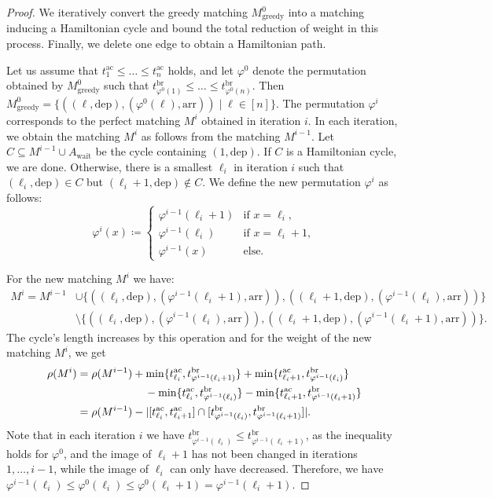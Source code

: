 \documentclass[11pt,a4paper]{article}
\newcommand{\arr}{\mathrm{arr}}
\newcommand{\dep}{\mathrm{dep}}
\newcommand{\wait}{\mathrm{wait}}
\newcommand{\energyact}{M}               %
\newcommand{\ac}{\mathrm{ac}}
\newcommand{\br}{\mathrm{br}}
\newcommand{\w}{\rho} %
\theoremstyle{definition}
\theoremstyle{remark}
\begin{document}
\begin{proof}
	We iteratively convert the greedy matching $\energyact^{0}_\text{greedy}$ into a matching inducing a Hamiltonian cycle and bound the total reduction of weight in this process. Finally, we delete one edge to obtain a Hamiltonian path.
	
	Let us assume that $t^{\ac}_1 \leq \dots \leq t^{\ac}_n$ holds, and let $\varphi^{0}$ denote the permutation obtained by $\energyact^{0}_\text{greedy}$ such that $t^{\br}_{\varphi^{0}(1)} \leq \dots \leq t^{\br}_{ \varphi^{0}(n)}$. Then $\energyact^{0}_\text{greedy} = \{( (\ell, \dep), (\varphi^{0}(\ell), \arr)) \mid \ell \in [n]\}$. 
	The permutation $\varphi^{i}$ corresponds to the perfect matching $\energyact^{i}$ obtained in iteration $i$.	
	In each iteration, we obtain the matching $\energyact^{i}$ as follows from the matching $\energyact^{i-1}$.
	Let $C \subseteq \energyact^{i-1} \cup A_\wait$ be the cycle containing $(1, \dep)$. If $C$ is a Hamiltonian cycle, we are done. Otherwise, there is a smallest $\ell_i$ in iteration $i$ such that $(\ell_i, \dep) \in C$ but $(\ell_i +1, \dep) \not \in C$. 
    We define the new permutation $\varphi^{i}$ as follows:
	\[\varphi^{i}(x) \coloneqq \begin{cases}
		\varphi^{i-1}(\ell_i +1) &\text{if  } x = \ell_i, \\
		\varphi^{i-1}(\ell_i) &\text{if  } x = \ell_i +1, \\
		\varphi^{i-1}(x) &\text{else.} 
	\end{cases}\]
	
	For the new matching $\energyact^{i}$ we have:
    \begin{align*}
    \energyact^{i} = \energyact^{i-1} &\cup \bigl\{((\ell_i, \dep), (\varphi^{i-1}(\ell_i+1), \arr)), ((\ell_i+1,\dep),(\varphi^{i-1}(\ell_i),\arr))\bigr\} \\
    &\setminus \bigl\{((\ell_i, \dep), (\varphi^{i-1}(\ell_i), \arr)), ((\ell_i+1, \dep), (\varphi^{i-1}(\ell_i+1), \arr))\bigr\}.
    \end{align*}
    The cycle's length increases by this operation and for the weight of the new matching $\energyact^{i}$, we get
	\begin{align*}
		\w(\energyact^{i}) &= \w(\energyact^{i-1}) + \min\{t^{\ac}_{\ell_i}, t^{\br}_{\varphi^{i-1}(\ell_i+1)}\} + \min\{t^{\ac}_{\ell_i+1}, t^{\br}_{\varphi^{i-1}(\ell_i)}\} \\ & \hspace{62 pt} - \min\{t^{\ac}_{\ell_i}, t^{\br}_{\varphi^{i-1}(\ell_i)}\} - \min\{t^{\ac}_{\ell_i+1}, t^{\br}_{\varphi^{i-1}(\ell_i+1)}\} \\
		&= \w(\energyact^{i-1}) - | [t^{\ac}_{\ell_i}, t^{\ac}_{\ell_i+1} ] \cap [t^{\br}_{\varphi^{i-1}(\ell_i)}, t^{\br}_{\varphi^{i-1}(\ell_i+1)} ] |.
	\end{align*}
    Note that in each iteration $i$ we have $t_{\varphi^{i-1}(\ell_i)}^{\br} \le t_{\varphi^{i-1}(\ell_i+1)}^{\br}$, as the inequality holds for $\varphi^0$, and the image of $\ell_i + 1$ has not been changed in iterations~$1,\dotsc,i-1$, while the image of $\ell_i$ can only have decreased. 
    Therefore, we have $\varphi^{i-1}(\ell_i) \le \varphi^0(\ell_i) \le \varphi^0(\ell_i+1) = \varphi^{i-1}(\ell_i+1)$.
    

\end{proof}
\end{document}
